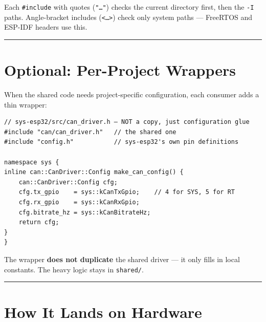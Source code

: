 \documentclass[12pt,a4paper,oneside]{report}
\begin{document}
Each \texttt{\#include} with quotes (\texttt{"…"}) checks the current directory
first, then the \texttt{-I} paths. Angle-bracket includes
(\texttt{\textless{}…\textgreater{}}) check only system paths --- FreeRTOS and
ESP-IDF headers use this.

\begin{center}\rule{0.5\linewidth}{0.5pt}\end{center}

\section{Optional: Per-Project Wrappers}\label{optional-per-project-wrappers}

When the shared code needs project-specific configuration, each consumer adds a
thin wrapper:

\begin{verbatim}
// sys-esp32/src/can_driver.h — NOT a copy, just configuration glue
#include "can/can_driver.h"   // the shared one
#include "config.h"           // sys-esp32's own pin definitions

namespace sys {
inline can::CanDriver::Config make_can_config() {
    can::CanDriver::Config cfg;
    cfg.tx_gpio    = sys::kCanTxGpio;    // 4 for SYS, 5 for RT
    cfg.rx_gpio    = sys::kCanRxGpio;
    cfg.bitrate_hz = sys::kCanBitrateHz;
    return cfg;
}
}
\end{verbatim}

The wrapper \textbf{does not duplicate} the shared driver --- it only fills in
local constants. The heavy logic stays in \texttt{shared/}.

\begin{center}\rule{0.5\linewidth}{0.5pt}\end{center}

\section{How It Lands on Hardware}\label{how-it-lands-on-hardware}
\end{document}

